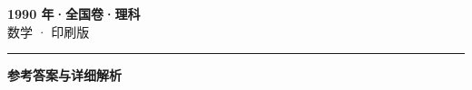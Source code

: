 \documentclass[zihao=5, a4paper]{ctexart}
\begin{document}
\begin{center}
  {\Large\bfseries 1990 年·全国卷·理科}\\[4pt]
  {\large 数学 · 印刷版}
\end{center}
\medskip
{}

\par\bigskip\hrule\bigskip
{}
\begin{center}{\large\bfseries 参考答案与详细解析}\end{center}
\smallskip

\end{document}
